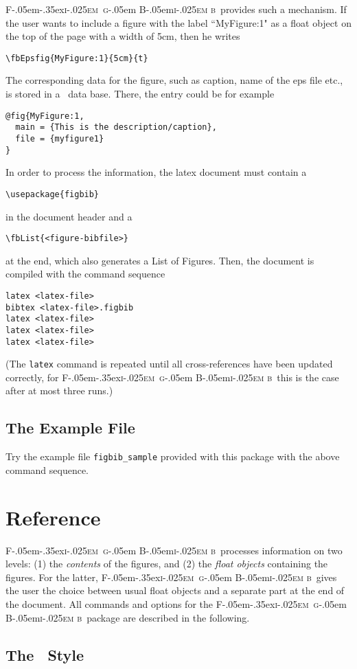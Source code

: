 \documentclass{ltxdoc}
\def\FigBib{{\rmfamily F\kern-.05em\lower-.35ex\hbox{\textsc{i\kern-.025em g}}\kern-.05em%
    B\kern-.05em\textsc{i\kern-.025em b}}}
\begin{document}
\FigBib\ provides such a mechanism. If the user wants to include a
figure with the label ``MyFigure:1" as a float object on the top
of the page with a width of 5cm, then he writes
\begin{verbatim}
\fbEpsfig{MyFigure:1}{5cm}{t}
\end{verbatim}
The corresponding data for the figure, such as caption, name of
the eps file etc., is stored in a \BibTeX\ data base. There, the
entry could be for example
\begin{verbatim}
@fig{MyFigure:1,
  main = {This is the description/caption},
  file = {myfigure1}
}
\end{verbatim}
In order to process the information, the latex document must
contain a
\begin{verbatim}
\usepackage{figbib}
\end{verbatim}
in the document header and a
\begin{verbatim}
\fbList{<figure-bibfile>}
\end{verbatim}
at the end, which also generates a List of Figures. Then, the
document is compiled with the command sequence
\begin{verbatim}
latex <latex-file>
bibtex <latex-file>.figbib
latex <latex-file>
latex <latex-file>
latex <latex-file>
\end{verbatim}
(The \texttt{latex} command is repeated until all cross-references
have been updated correctly, for \FigBib\ this is the case after
at most three runs.)

\subsection{The Example File}
Try the example file \texttt{figbib\_sample} provided with this
package with the above command sequence.

\section{Reference}

\FigBib\ processes information on two levels: (1) the
\emph{contents} of the figures, and (2) the \emph{float objects} containing
the figures. For the latter, \FigBib\ gives the user the choice
between usual float objects and a separate part at the end of the
document. All commands and options for the \FigBib\ package are
described in the following.

\subsection{The \BibTeX\ Style}
\end{document}

